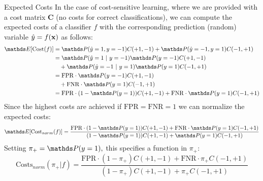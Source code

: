 \documentclass[11pt,compress,t,notes=noshow, xcolor=table]{beamer}
\begin{document}
	\begin{frame}{Expected Costs}
	\footnotesize
%			
			In the case of cost-sensitive learning, where we are provided with a cost matrix $\mathbf{C}$ (no costs for correct classifications), we can compute the expected costs of a classifier $f$ with the corresponding prediction (random) variable $\hat{y} = f(\mathbf{x})$ as follows:
%			
			\begin{align*}
%				
				\E[ \mathrm{Cost}(f) ] 
%
				&= \P(\yh=1, y=-1) C(+1,-1) + \P(\yh= - 1, y=1) C(-1,+1) \\
%
				&= \P(\yh=1~|~ y=-1) \P(y=-1) C(+1,-1)  \\
				&\quad + \P(\yh = - 1 ~|~ y=1) \P(y=1) C(-1,+1) \\
%				
				&= \mathrm{FPR }\cdot \P(y=-1) C(+1,-1) \\
%				
				&\quad + \mathrm{FNR}\cdot  \P(y=1) C(-1,+1) \\
%				
				&= \mathrm{FPR }\cdot (1- \P(y=1)) C(+1,-1) + \mathrm{FNR}\cdot  \P(y=1) C(-1,+1)
%				
			\end{align*}
%			
		Since the highest costs are achieved if $\mathrm{FPR } = \mathrm{FNR } = 1$ we can normalize the expected costs:
%		
		$$  \E[ \mathrm{Cost}_{norm}(f) ] = \frac{\mathrm{FPR }\cdot (1- \P(y=1)) C(+1,-1) + \mathrm{FNR}\cdot  \P(y=1) C(-1,+1)}{(1- \P(y=1)) C(+1,-1) + \P(y=1) C(-1,+1)} $$
%
		Setting $\pi_+ =  \P(y=1),$ this specifies a function in $\pi_+:$
%		
		$$  \mathrm{Costs}_{norm}(\pi_+ | f) = \frac{\mathrm{FPR }\cdot (1- \pi_+) C(+1,-1) + \mathrm{FNR}\cdot  \pi_+ C(-1,+1)}{(1- \pi_+) C(+1,-1) + \pi_+ C(-1,+1)}  $$
	\end{frame}
	
\end{document}
